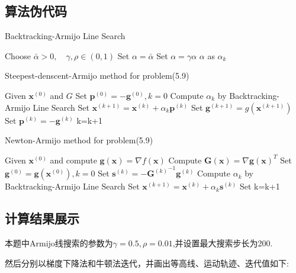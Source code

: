\subsection{算法伪代码}

\begin{algorithm}[h]  
\caption{Backtracking-Armijo Line Search}  
\begin{algorithmic}[1]  
\STATE Choose $\bar{\alpha}>0,\quad \gamma,\rho\in (0,1)$
\STATE Set $\alpha=\bar{\alpha}$
\STATE Set $\alpha=\gamma\alpha$
\ENDWHILE
\RETURN $\alpha$ as $\alpha_k$
\end{algorithmic}  
\end{algorithm}


\begin{algorithm}[h]  
\caption{Steepest-denscent-Armijo method for problem(5.9)}  
\begin{algorithmic}[1]  
\STATE Given $\bm{x}^{(0)}$ and $G$
\STATE Set $\bm{p}^{(0)}=-\bm{g}^{(0)},k=0$
\STATE Compute $\alpha_k$ by Backtracking-Armijo Line Search
\STATE Set $\bm{x}^{(k+1)}=\bm{x}^{(k)}+\alpha_k\bm{p}^{(k)}$
\STATE Set $\bm{g}^{(k+1)}=g(\bm{x}^{(k+1)})$
\STATE Set $\bm{p}^{(k)}=-\bm{g}^{(k)}$
\STATE k=k+1
\ENDWHILE
\end{algorithmic}  
\end{algorithm}

\begin{algorithm}[h]  
\caption{Newton-Armijo method for problem(5.9)}  
\begin{algorithmic}[1]  
\STATE Given $\bm{x}^{(0)}$ and compute $\bm{g}(\bm{x})= \nabla f(\bm{x})$
\STATE Compute $\bm{G}(\bm{x})= \nabla {\bm{g}(\bm{x})}^T$
\STATE Set $\bm{g}^{(0)}=\bm{g}(\bm{x}^{(0)}),k=0$
\STATE Set $\bm{s}^{(k)}=-{\bm{G}^{(k)}}^{-1}\bm{g}^{(k)}$
\STATE Compute $\alpha_k$ by Backtracking-Armijo Line Search
\STATE Set $\bm{x}^{(k+1)}=\bm{x}^{(k)}+\alpha_k\bm{s}^{(k)}$
\STATE Set k=k+1
\ENDWHILE
\end{algorithmic}  
\end{algorithm} 

\subsection{计算结果展示}

本题中Armijo线搜索的参数为$\gamma=0.5,\rho=0.01$,并设置最大搜索步长为200.

然后分别以梯度下降法和牛顿法迭代，并画出等高线、运动轨迹、迭代值如下:


